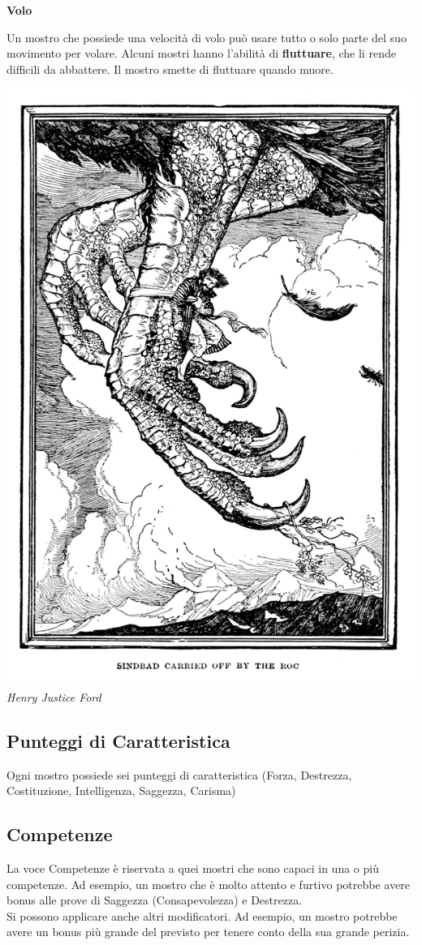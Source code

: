 \begin{multicols}{2}
\medskip\textbf{Volo}

Un mostro che possiede una velocità di volo può usare tutto o solo parte del suo movimento per volare. Alcuni mostri hanno l'abilità di \textbf{fluttuare}, che li rende difficili da abbattere. Il mostro smette di fluttuare quando muore.

\begin{center}
	\includegraphics[width=0.7\linewidth]{immagini/roc.png}\\
	\textit{Henry Justice Ford}
\end{center}


\subsection{Punteggi di Caratteristica}

Ogni mostro possiede sei punteggi di caratteristica (Forza, Destrezza, Costituzione, Intelligenza, Saggezza, Carisma)

\subsection{Competenze}

La voce Competenze è riservata a quei mostri che sono capaci in una o più competenze. Ad esempio, un mostro che è molto attento e furtivo potrebbe avere bonus alle prove di Saggezza (Consapevolezza) e Destrezza. \\
Si possono applicare anche altri modificatori. Ad esempio, un mostro potrebbe avere un bonus più grande del previsto per tenere conto della sua grande perizia.


\end{multicols}
